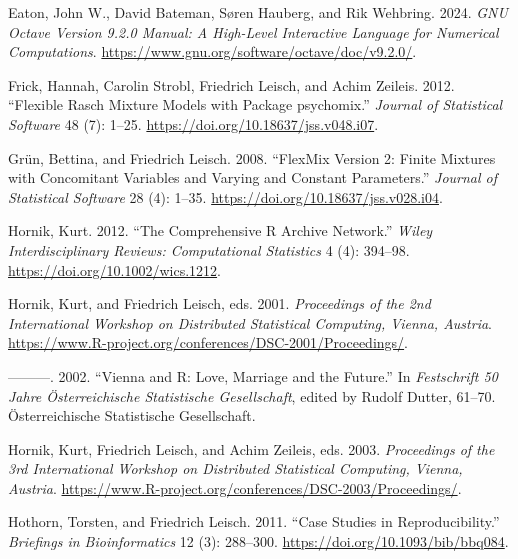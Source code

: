 \begin{CSLReferences}{1}{0}
\leavevmode{}%
Eaton, John W., David Bateman, Søren Hauberg, and Rik Wehbring. 2024. \emph{{GNU} {O}ctave Version 9.2.0 Manual: {A} High-Level Interactive Language for Numerical Computations}. \url{https://www.gnu.org/software/octave/doc/v9.2.0/}.

\leavevmode{}%
Frick, Hannah, Carolin Strobl, Friedrich Leisch, and Achim Zeileis. 2012. {``Flexible {R}asch Mixture Models with Package {psychomix}.''} \emph{Journal of Statistical Software} 48 (7): 1--25. \url{https://doi.org/10.18637/jss.v048.i07}.

\leavevmode{}%
Grün, Bettina, and Friedrich Leisch. 2008. {``FlexMix Version 2: Finite Mixtures with Concomitant Variables and Varying and Constant Parameters.''} \emph{Journal of Statistical Software} 28 (4): 1--35. \url{https://doi.org/10.18637/jss.v028.i04}.

\leavevmode{}%
Hornik, Kurt. 2012. {``The {C}omprehensive {R} {A}rchive {N}etwork.''} \emph{Wiley Interdisciplinary Reviews: Computational Statistics} 4 (4): 394--98. \url{https://doi.org/10.1002/wics.1212}.

\leavevmode{}%
Hornik, Kurt, and Friedrich Leisch, eds. 2001. \emph{Proceedings of the 2nd {I}nternational {W}orkshop on {D}istributed {S}tatistical {C}omputing, {V}ienna, {A}ustria}. \url{https://www.R-project.org/conferences/DSC-2001/Proceedings/}.

\leavevmode{}%
---------. 2002. {``{V}ienna and {R}: {L}ove, Marriage and the Future.''} In \emph{{F}estschrift 50 {J}ahre {Ö}sterreichische {S}tatistische {G}esellschaft}, edited by Rudolf Dutter, 61--70. {Ö}sterreichische Statistische Gesellschaft.

\leavevmode{}%
Hornik, Kurt, Friedrich Leisch, and Achim Zeileis, eds. 2003. \emph{Proceedings of the 3rd {I}nternational {W}orkshop on {D}istributed {S}tatistical {C}omputing, {V}ienna, {A}ustria}. \url{https://www.R-project.org/conferences/DSC-2003/Proceedings/}.

\leavevmode{}%
Hothorn, Torsten, and Friedrich Leisch. 2011. {``Case Studies in Reproducibility.''} \emph{Briefings in Bioinformatics} 12 (3): 288--300. \url{https://doi.org/10.1093/bib/bbq084}.


\end{CSLReferences}
